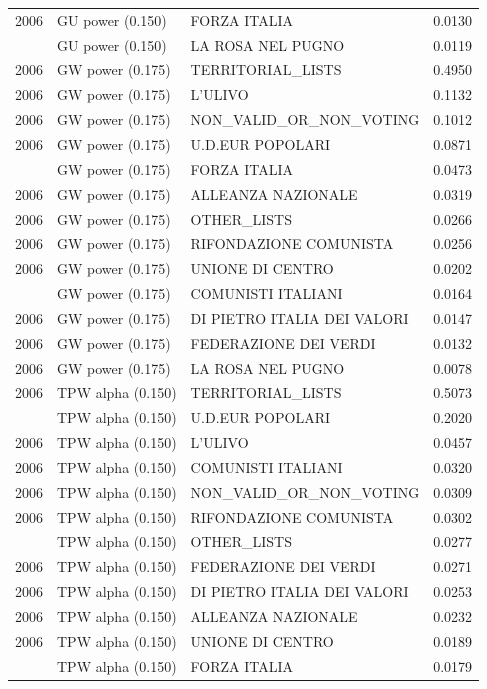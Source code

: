 \begin{longtable}[t]{rllr}
2006 & GU power (0.150) & FORZA ITALIA & 0.0130\\
\addlinespace
2006 & GU power (0.150) & LA ROSA NEL PUGNO & 0.0119\\
2006 & GW power (0.175) & TERRITORIAL\_LISTS & 0.4950\\
2006 & GW power (0.175) & L'ULIVO & 0.1132\\
2006 & GW power (0.175) & NON\_VALID\_OR\_NON\_VOTING & 0.1012\\
2006 & GW power (0.175) & U.D.EUR POPOLARI & 0.0871\\
\addlinespace
2006 & GW power (0.175) & FORZA ITALIA & 0.0473\\
2006 & GW power (0.175) & ALLEANZA NAZIONALE & 0.0319\\
2006 & GW power (0.175) & OTHER\_LISTS & 0.0266\\
2006 & GW power (0.175) & RIFONDAZIONE COMUNISTA & 0.0256\\
2006 & GW power (0.175) & UNIONE DI CENTRO & 0.0202\\
\addlinespace
2006 & GW power (0.175) & COMUNISTI ITALIANI & 0.0164\\
2006 & GW power (0.175) & DI PIETRO ITALIA DEI VALORI & 0.0147\\
2006 & GW power (0.175) & FEDERAZIONE DEI VERDI & 0.0132\\
2006 & GW power (0.175) & LA ROSA NEL PUGNO & 0.0078\\
2006 & TPW alpha (0.150) & TERRITORIAL\_LISTS & 0.5073\\
\addlinespace
2006 & TPW alpha (0.150) & U.D.EUR POPOLARI & 0.2020\\
2006 & TPW alpha (0.150) & L'ULIVO & 0.0457\\
2006 & TPW alpha (0.150) & COMUNISTI ITALIANI & 0.0320\\
2006 & TPW alpha (0.150) & NON\_VALID\_OR\_NON\_VOTING & 0.0309\\
2006 & TPW alpha (0.150) & RIFONDAZIONE COMUNISTA & 0.0302\\
\addlinespace
2006 & TPW alpha (0.150) & OTHER\_LISTS & 0.0277\\
2006 & TPW alpha (0.150) & FEDERAZIONE DEI VERDI & 0.0271\\
2006 & TPW alpha (0.150) & DI PIETRO ITALIA DEI VALORI & 0.0253\\
2006 & TPW alpha (0.150) & ALLEANZA NAZIONALE & 0.0232\\
2006 & TPW alpha (0.150) & UNIONE DI CENTRO & 0.0189\\
\addlinespace
2006 & TPW alpha (0.150) & FORZA ITALIA & 0.0179\\

\end{longtable}
